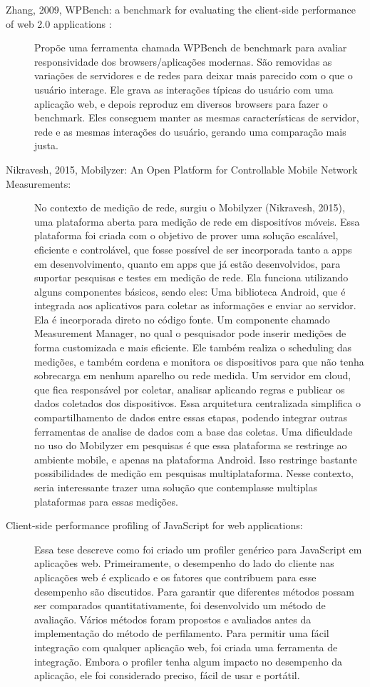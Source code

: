 \documentclass[12pt]{tcc}
\begin{document}
\begin{description}
	\item[Zhang, 2009, WPBench: a benchmark for evaluating the client-side performance of web 2.0 applications
	:]
	Propõe uma ferramenta chamada WPBench de benchmark para avaliar responsividade dos browsers/aplicações modernas. São removidas as variações de servidores e de redes para deixar mais parecido com o que o usuário interage. Ele grava as interações típicas do usuário com uma aplicação web, e depois reproduz em diversos browsers para fazer o benchmark. Eles conseguem manter as mesmas características de servidor, rede e as mesmas interações do usuário, gerando uma comparação mais justa.

	\item[Nikravesh, 2015, Mobilyzer: An Open Platform for Controllable Mobile Network Measurements:]
	No contexto de medição de rede, surgiu o Mobilyzer (Nikravesh, 2015), uma plataforma aberta para medição de rede em dispositívos móveis. Essa plataforma foi criada com o objetivo de prover uma solução escalável, eficiente e controlável, que fosse possível de ser incorporada tanto a apps em desenvolvimento, quanto em apps que já estão desenvolvidos, para suportar pesquisas e testes em medição de rede. 
	Ela funciona utilizando alguns componentes básicos, sendo eles:
	Uma biblioteca Android, que é integrada aos aplicativos para coletar as informações e enviar ao servidor. Ela é incorporada direto no código fonte.
	Um componente chamado Measurement Manager, no qual o pesquisador pode inserir medições de forma customizada e mais eficiente. Ele também realiza o scheduling das medições, e também cordena e monitora os dispositivos para que não tenha sobrecarga em nenhum aparelho ou rede medida.
	Um servidor em cloud, que fica responsável por coletar, analisar aplicando regras e publicar os dados coletados dos dispositivos. Essa arquitetura centralizada simplifica o compartilhamento de dados entre essas etapas, podendo integrar outras ferramentas de analise de dados com a base das coletas.
	Uma dificuldade no uso do Mobilyzer em pesquisas é que essa plataforma se restringe ao ambiente mobile, e apenas na plataforma Android. Isso restringe bastante possibilidades de medição em pesquisas multiplataforma. Nesse contexto, seria interessante trazer uma solução que contemplasse multiplas plataformas para essas medições.

	\item[Client-side performance profiling of JavaScript for web applications:]
	Essa tese descreve como foi criado um profiler genérico para JavaScript em aplicações web. Primeiramente, o desempenho do lado do cliente nas aplicações web é explicado e os fatores que contribuem para esse desempenho são discutidos. Para garantir que diferentes métodos possam ser comparados quantitativamente, foi desenvolvido um método de avaliação. Vários métodos foram propostos e avaliados antes da implementação do método de perfilamento. Para permitir uma fácil integração com qualquer aplicação web, foi criada uma ferramenta de integração. Embora o profiler tenha algum impacto no desempenho da aplicação, ele foi considerado preciso, fácil de usar e portátil.


\end{description}
\end{document}
